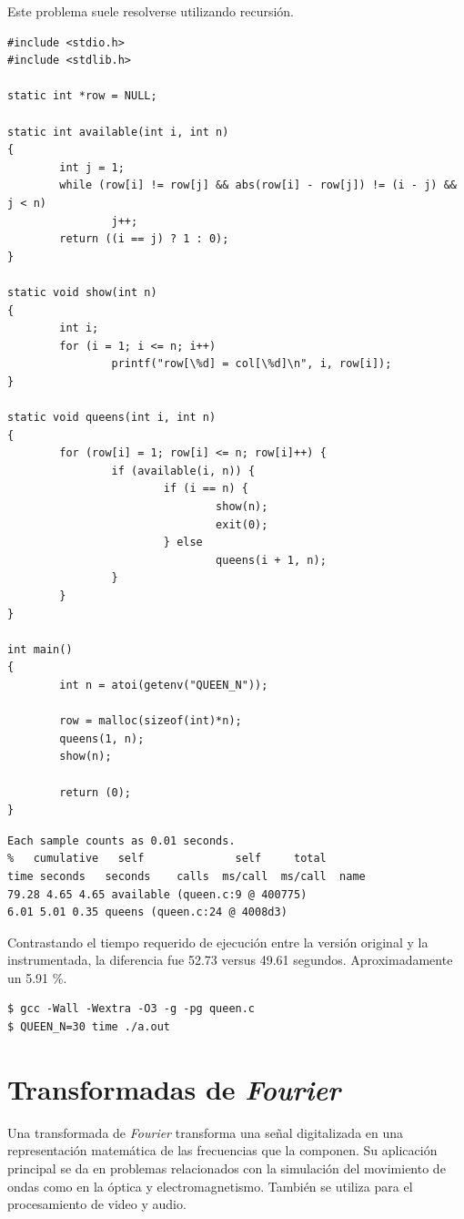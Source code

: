 \documentclass[a4paper]{report}
\begin{document}
Este problema suele resolverse utilizando recursión.

\begin{lstlisting}
#include <stdio.h>
#include <stdlib.h>

static int *row = NULL;

static int available(int i, int n)
{
        int j = 1;
        while (row[i] != row[j] && abs(row[i] - row[j]) != (i - j) && j < n)
                j++;
        return ((i == j) ? 1 : 0);
}

static void show(int n)
{
        int i;
        for (i = 1; i <= n; i++)
                printf("row[\%d] = col[\%d]\n", i, row[i]);
}

static void queens(int i, int n)
{
        for (row[i] = 1; row[i] <= n; row[i]++) {
                if (available(i, n)) {
                        if (i == n) {
                                show(n);
                                exit(0);
                        } else
                                queens(i + 1, n);
                }
        }
}

int main()
{
        int n = atoi(getenv("QUEEN_N"));

        row = malloc(sizeof(int)*n);
        queens(1, n);
        show(n);

        return (0);
}
\end{lstlisting}

\begin{lstlisting}
Each sample counts as 0.01 seconds.
%   cumulative   self              self     total
time seconds   seconds    calls  ms/call  ms/call  name
79.28 4.65 4.65 available (queen.c:9 @ 400775)
6.01 5.01 0.35 queens (queen.c:24 @ 4008d3)
\end{lstlisting}

Contrastando el tiempo requerido de ejecución entre la versión original y la instrumentada,
la diferencia fue 52.73 versus 49.61 segundos. Aproximadamente un 5.91 \%.

\begin{lstlisting}
$ gcc -Wall -Wextra -O3 -g -pg queen.c
$ QUEEN_N=30 time ./a.out
\end{lstlisting}

\section{Transformadas de {\it Fourier}}

Una transformada de {\it Fourier} \cite{fourier} transforma una señal
digitalizada en una representación matemática de las frecuencias que la
componen. Su aplicación principal se da en problemas relacionados con la simulación del
movimiento de ondas como en la óptica y electromagnetismo. También se utiliza para el procesamiento de video y audio.
\end{document}

